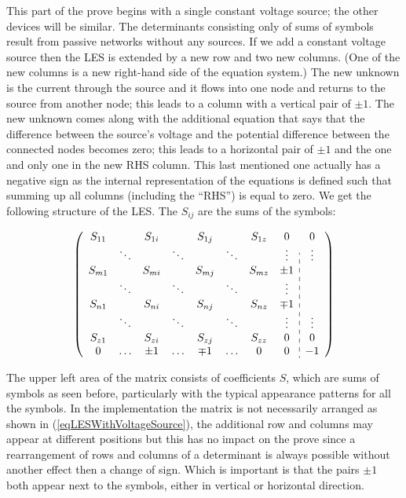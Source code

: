 This part of the prove begins with a single constant voltage source; the
other devices will be similar. The determinants consisting only of sums of
symbols result from passive networks without any sources. If we add a
constant voltage source then the LES is extended by a new row and two new
columns. (One of the new columns is a new right-hand side of the equation
system.) The new unknown is the current through the source and it flows
into one node and returns to the source from another node; this leads to a
column with a vertical pair of $\pm 1$. The new unknown comes along with
the additional equation that says that the difference between the source's
voltage and the potential difference between the connected nodes becomes
zero; this leads to a horizontal pair of $\pm 1$ and the one and only one
in the new RHS column. This last mentioned one actually has a negative
sign as the internal representation of the equations is defined such that
summing up all columns (including the ``RHS'') is equal to zero. We get
the following structure of the LES. The $S_{ij}$ are the sums of the
symbols:

\begin{equation}
\label{eqLESWithVoltageSource}
\left(
\begin{array}{cccccccc:c}
 S_{11}  &        &  S_{1i}  &        &  S_{1j}  &        &  S_{1z}  & 0       & 0      \\
         & \ddots &          & \ddots &          & \ddots &          & \vdots  & \vdots \\
 S_{m1}  &        &  S_{mi}  &        &  S_{mj}  &        &  S_{mz}  &  \pm 1  &        \\
         & \ddots &          & \ddots &          & \ddots &          & \vdots  &        \\
 S_{n1}  &        &  S_{ni}  &        &  S_{nj}  &        &  S_{nz}  &  \mp 1  &        \\
         & \ddots &          & \ddots &          & \ddots &          & \vdots  & \vdots \\
 S_{z1}  &        &  S_{zi}  &        &  S_{zj}  &        &  S_{zz}  & 0       & 0      \\
0        & \ldots &  \pm 1   & \ldots &  \mp 1   & \ldots &        0 & 0       & -1     \\
\end{array}
\right)
\end{equation}

The upper left area of the matrix consists of coefficients $S$, which are
sums of symbols as seen before, particularly with the typical appearance
patterns for all the symbols. In the implementation the matrix is not
necessarily arranged as shown in (\ref{eqLESWithVoltageSource}), the
additional row and columns may appear at different positions but this has
no impact on the prove since a rearrangement of rows and columns of a
determinant is always possible without another effect then a change of
sign. Which is important is that the pairs $\pm 1$ both appear next to the
symbols, either in vertical or horizontal direction.

